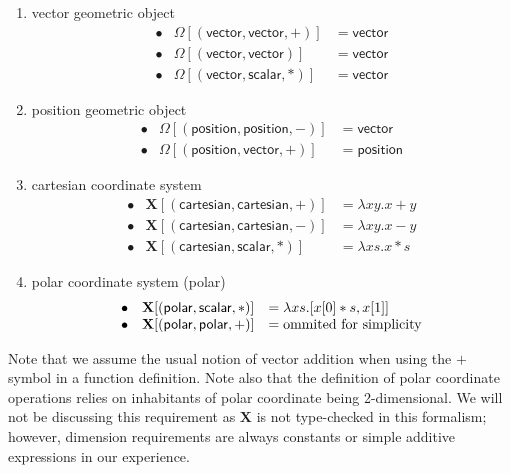 \documentclass{article}
\newcommand{\Chi}{\mathbf{X}}
\begin{document}
\begin{enumerate}
	\item \textsf{vector} geometric object
	 \[\begin{array}{lll}%
		\bullet& \Omega[(\mathsf{vector},\mathsf{vector},+)]&=\mathsf{vector}\\
		\bullet&
		\Omega[(\mathsf{vector},\mathsf{vector})]&=\mathsf{vector}\\
		\bullet&
		\Omega[(\mathsf{vector},\mathsf{scalar},*)]&=\mathsf{vector}
	\end{array}\]
	
	\item \textsf{position} geometric object
	\[\begin{array}{lll}%
		\bullet& \Omega[(\mathsf{position},\mathsf{position},-)]&=\mathsf{vector}\\
		\bullet&
		\Omega[(\mathsf{position},\mathsf{vector},+)]&=\mathsf{position}	
	\end{array}\]
	
	\item \textsf{cartesian} coordinate system\\
	\[\begin{array}{lll}%
		\bullet& 
		\Chi[(\mathsf{cartesian},\mathsf{cartesian},+)]&=\lambda xy.x + y\\
		\bullet&
		\Chi[(\mathsf{cartesian},\mathsf{cartesian},-)]&=\lambda xy.x - y\\
		\bullet&
		\Chi[(\mathsf{cartesian},\mathsf{scalar},*)]&=\lambda xs.x * s
	\end{array}\]
	
	\item polar coordinate system (\textsf{polar})\\
	\[\begin{array}{lll}%
		\bullet&
		\Chi[(\mathsf{polar},\mathsf{scalar},*)]&=\lambda xs.[x[0] * s, x[1]]\\
		\bullet& 
		\Chi[(\mathsf{polar},\mathsf{polar},+)]&=\textnormal{ommited for simplicity}\\
	\end{array}\]
\end{enumerate}
Note that we assume the usual notion of vector addition when using the $+$ symbol in a function definition.
Note also that the definition of polar coordinate operations relies on inhabitants of polar coordinate being 2-dimensional.
We will not be discussing this requirement as $\Chi$ is not type-checked in this formalism; however, dimension requirements are always constants or simple additive expressions in our experience.
\end{document}
